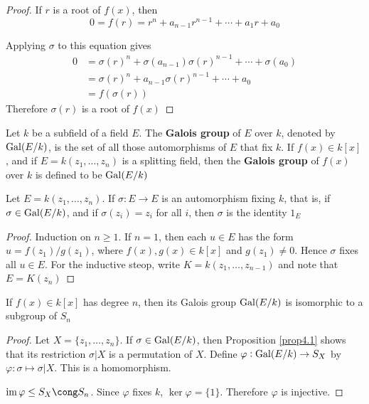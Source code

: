 \documentclass[11pt]{article}
\begin{document}
\begin{proof}
If \(r\) is a root of \(f(x)\), then 
\begin{equation*}
0=f(r)=r^n+a_{n-1}r^{n-1}+\cdots+a_1r+a_0
\end{equation*}

Applying \(\sigma\) to this equation gives
\begin{align*}
0&=\sigma(r)^n+\sigma(a_{n-1})\sigma(r)^{n-1}+\cdots+\sigma(a_0)\\
&=\sigma(r)^n+a_{n-1}\sigma(r)^{n-1}+\cdots+a_0\\
&=f(\sigma(r))
\end{align*}
Therefore \(\sigma(r)\) is a root of \(f(x)\)
\end{proof}

\begin{definition}[]
Let \(k\) be a subfield of a field \(E\). The \textbf{Galois group} of \(E\) over \(k\),
denoted by \(\operatorname{Gal}(E/k)\), is the set of all those automorphisms of \(E\) that
fix \(k\). If \(f(x)\in k[x]\), and if \(E=k(z_1,\dots,z_n)\) is a splitting
field, then the \textbf{Galois group} of \(f(x)\) over \(k\) is defined to be \(\operatorname{Gal}(E/k)\)
\end{definition}

\begin{lemma}[]
\label{lemma4.2}
\label{nlemma3.2}
Let \(E=k(z_1,\dots,z_n)\). If \(\sigma:E\to E\) is an automorphism fixing \(k\),
that is, if \(\sigma\in\operatorname{Gal}(E/k)\), and if \(\sigma(z_i)=z_i\) for all \(i\), then
\(\sigma\) is the identity \(1_E\)
\end{lemma}

\begin{proof}
Induction on \(n\ge1\). If \(n=1\), then each \(u\in E\) has the form 
\(u=f(z_1)/g(z_1)\), where \(f(x),g(x)\in k[x]\) and \(g(z_1)\neq0\). Hence
\(\sigma\) fixes all \(u\in E\). For the inductive steop, write
\(K=k(z_1,\dots,z_{n-1})\) and note that \(E=K(z_n)\)
\end{proof}

\begin{theorem}[]
If \(f(x)\in k[x]\) has degree \(n\), then its Galois group \(\operatorname{Gal}(E/k)\) is
isomorphic to a subgroup of \(S_n\)
\end{theorem}

\begin{proof}
Let \(X=\{z_1,\dots,z_n\}\). If \(\sigma\in\operatorname{Gal}(E/k)\), then Proposition
\ref{prop4.1} shows that its restriction \(\sigma|X\) is a permutation of \(X\).
Define \(\varphi:\operatorname{Gal}(E/k)\to S_X\) by \(\varphi:\sigma\mapsto\sigma|X\). This is a
homomorphism.

\(\im\varphi\le S_X\cong S_n\). Since \(\varphi\) fixes \(k\), \(\ker\varphi=\{1\}\).
Therefore \(\varphi\) is injective.
\end{proof}
\end{document}

